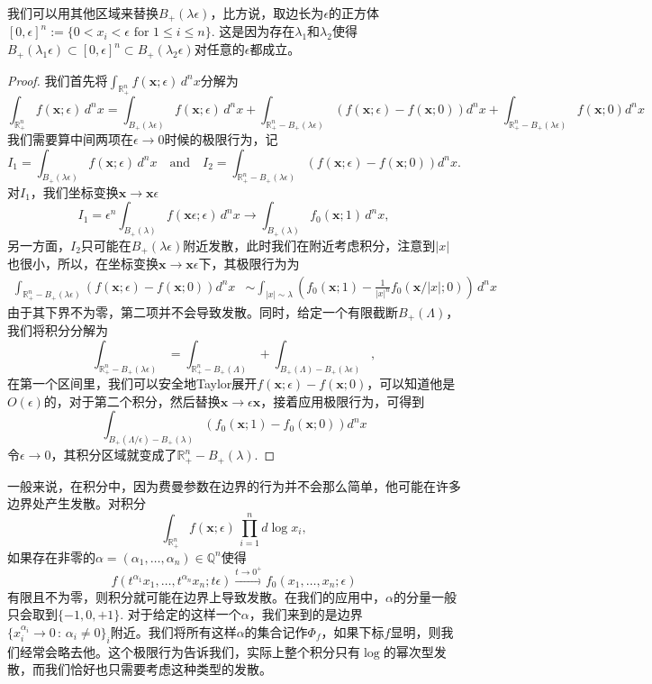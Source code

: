 \documentclass[12pt]{article}
\theoremstyle{definition}
\theoremstyle{plain}
\begin{document}
我们可以用其他区域来替换$B_+(\lambda \epsilon)$，比方说，取边长为$\epsilon$的正方体$[0,\epsilon]^n:=\{ 0<x_i<\epsilon \text{ for }1\leq i\leq n\}$. 这是因为存在$\lambda_1$和$\lambda_2$使得$B_+(\lambda_1\epsilon)\subset [0,\epsilon]^n\subset B_+(\lambda_2\epsilon)$对任意的$\epsilon$都成立。

\begin{proof}
我们首先将$\int_{\mathbb R_+^n} f(\mathbf{x};\epsilon)\,d^nx$分解为
\[
\int_{\mathbb R_+^n} f(\mathbf{x};\epsilon)\,d^nx=\int_{B_+(\lambda \epsilon)} f(\mathbf{x};\epsilon)\,d^nx+\int_{\mathbb R_+^n - B_+(\lambda \epsilon)} (f(\mathbf{x};\epsilon)-f(\mathbf{x};0))d^nx + \int_{\mathbb R_+^n - B_+(\lambda \epsilon)} f(\mathbf{x};0)d^nx
\]
我们需要算中间两项在$\epsilon\to 0$时候的极限行为，记
\[
I_1=\int_{B_+(\lambda \epsilon)} f(\mathbf{x};\epsilon)\,d^nx
\quad \text{and} \quad
I_2=\int_{\mathbb R_+^n - B_+(\lambda \epsilon)} (f(\mathbf{x};\epsilon)-f(\mathbf{x};0))d^nx.
\]
对$I_1$，我们坐标变换$\mathbf{x}\to \mathbf{x}\epsilon$
\[
I_1=\epsilon^n\int_{B_+(\lambda)} f(\mathbf{x}\epsilon;\epsilon)\,d^nx
\to \int_{B_+(\lambda)} f_0(\mathbf{x};1)\,d^nx,
\]
另一方面，$I_2$只可能在$B_+(\lambda \epsilon)$附近发散，此时我们在附近考虑积分，注意到$|x|$也很小，所以，在坐标变换$\mathbf{x}\to \mathbf{x}\epsilon$下，其极限行为为
\[
\begin{aligned}
\int_{\mathbb R_+^n - B_+(\lambda \epsilon)} (f(\mathbf{x};\epsilon)-f(\mathbf{x};0))d^nx &\sim \int_{|x|\sim \lambda } \left(f_0(\mathbf{x};1)-\frac{1}{|x|^n}f_0(\mathbf{x}/|x|;0)\right)\,d^n x
\end{aligned}
\]
由于其下界不为零，第二项并不会导致发散。同时，给定一个有限截断$B_+(\Lambda)$，我们将积分分解为
\[
	\int_{\mathbb R_+^n - B_+(\lambda \epsilon)}=\int_{\mathbb R_+^n - B_+(\Lambda)}+\int_{B_+(\Lambda) - B_+(\lambda \epsilon)},
\]
在第一个区间里，我们可以安全地Taylor展开$f(\mathbf{x};\epsilon)-f(\mathbf{x};0)$，可以知道他是$O(\epsilon)$的，对于第二个积分，然后替换$\mathbf{x}\to \epsilon \mathbf{x}$，接着应用极限行为，可得到
\[
	\int_{B_+(\Lambda/\epsilon) - B_+(\lambda)}(f_0(\mathbf{x};1)-f_0(\mathbf{x};0))d^nx
\]
令$\epsilon\to 0$，其积分区域就变成了$\mathbb{R}_+^n-B_+(\lambda)$.
\end{proof}

一般来说，在积分中，因为费曼参数在边界的行为并不会那么简单，他可能在许多边界处产生发散。对积分
\[
	\int_{\mathbb R_+^n} f(\mathbf{x};\epsilon)\,\prod_{i=1}^n d\log x_i,
\]
如果存在非零的$\alpha=(\alpha_1,\dots,\alpha_n)\in \mathbb Q^n$使得
\[
f(t^{\alpha_1}x_1,\dots,t^{\alpha_n}x_n;t\epsilon)\xrightarrow{t\to 0^+}f_0(x_1,\dots,x_n;\epsilon)
\]
有限且不为零，则积分就可能在边界上导致发散。在我们的应用中，$\alpha$的分量一般只会取到$\{-1,0,+1\}$. 对于给定的这样一个$\alpha$，我们来到的是边界$\{x_i^{\alpha_i}\to 0\,:\,\alpha_i\neq 0\}_i$附近。我们将所有这样$\alpha$的集合记作$\Phi_f$，如果下标$f$显明，则我们经常会略去他。这个极限行为告诉我们，实际上整个积分只有$\log$的幂次型发散，而我们恰好也只需要考虑这种类型的发散。
\end{document}
